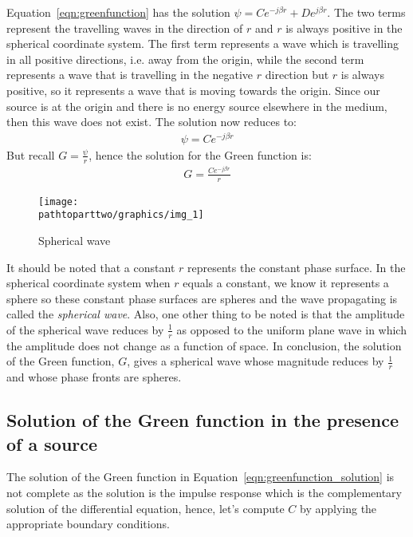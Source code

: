 Equation~\eqref{eqn:greenfunction} has the solution $\psi = Ce^{-j\beta r} + De^{j\beta r}$. The two terms represent the travelling waves in the direction of $r$ and $r$ is always positive in the spherical coordinate system. The first term represents a wave which is travelling in all positive directions, i.e. away from the origin, while the second term represents a wave that is travelling in the negative $r$ direction but $r$ is always positive, so it represents a wave that is moving towards the origin. Since our source is at the origin and there is no energy source elsewhere in the medium, then this wave does not exist. The solution now reduces to:
\begin{align*}
\psi = Ce^{-j\beta r}
\end{align*}
But recall $G = \frac{\psi}{r}$, hence the solution for the Green function is:
\begin{align}
G = \frac{Ce^{-j\beta r}}{r}
\label{eqn:greenfunction_solution}
\end{align}
\begin{figure}[h]
\centering
\texttt{[image: \\pathtoparttwo/graphics/img\_1]}
\caption{Spherical wave}
\label{fig:sphericalwave}
\end{figure}

It should be noted that a constant $r$ represents the constant phase surface. In the spherical coordinate system when $r$ equals a constant, we know it represents a sphere so these constant phase surfaces are spheres and the wave propagating is called the \emph{spherical wave}. Also, one other thing to be noted is that the amplitude of the spherical wave reduces by $\frac{1}{r}$ as opposed to the uniform plane wave in which the amplitude does not change as a function of space. In conclusion, the solution of the Green function, $G$, gives a spherical wave whose magnitude reduces by  $\frac{1}{r}$ and whose phase fronts are spheres.

\subsection{Solution of the Green function in the presence of a source}
The solution of the Green function in Equation~\eqref{eqn:greenfunction_solution} is not complete as the solution is the impulse response which is the complementary solution of the differential equation, hence, let's compute $C$ by applying the appropriate boundary conditions.

